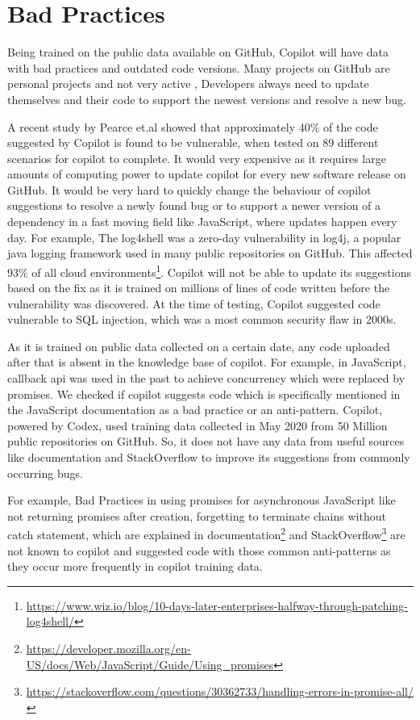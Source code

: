 \section{Bad Practices}
Being trained on the public data available on GitHub, Copilot\cite{copilot} will have data with bad practices and outdated code versions. Many projects on GitHub are personal projects and not very active , Developers always need to update themselves and their code to support the newest versions and resolve a new bug. 

A recent study by Pearce et.al\cite{copilot_security} showed that approximately 40\% of the code suggested by Copilot is found to be vulnerable, when tested on 89 different scenarios for copilot to complete. It would very expensive as it requires large amounts of computing power to update copilot for every new software release on GitHub. It would be very hard to quickly change the behaviour of copilot suggestions to resolve a newly found bug or to support a newer version of a dependency in a fast moving field like JavaScript, where updates happen every day. For example, The log4shell was a zero-day vulnerability in log4j, a popular java logging framework used in many public repositories on GitHub. This affected 93\% of all cloud environments\footnote{\url{https://www.wiz.io/blog/10-days-later-enterprises-halfway-through-patching-log4shell/}}.  Copilot will not be able to update its suggestions based on the fix as it is trained on millions of lines of code written before the vulnerability was discovered. At the time of testing, Copilot suggested code vulnerable to SQL injection, which was a most common security flaw in 2000s. 

As it is trained on public data collected on a certain date, any code uploaded after that is absent in the knowledge base of copilot. For example, in JavaScript, callback api was used in the past to achieve concurrency which were replaced by promises. We checked if copilot suggests code which is specifically mentioned in the JavaScript documentation as a bad practice or an anti-pattern. Copilot, powered by Codex, used training data collected in May 2020 from 50 Million public repositories on GitHub\cite{copilot}. So, it does not have any data from useful sources like documentation and StackOverflow to improve its suggestions from commonly occurring bugs.

For example, Bad Practices in using promises for asynchronous JavaScript like not returning promises after creation, forgetting to terminate chains without catch statement, which are explained in documentation\footnote{\url{https://developer.mozilla.org/en-US/docs/Web/JavaScript/Guide/Using_promises}} and StackOverflow\footnote{\url{https://stackoverflow.com/questions/30362733/handling-errors-in-promise-all/}} are not known to copilot and suggested code with those common anti-patterns as they occur more frequently in copilot training data.

